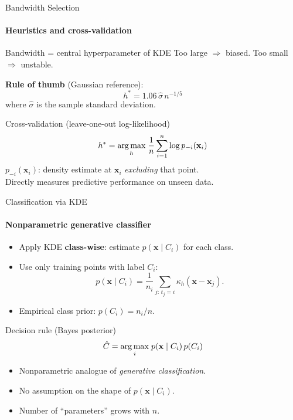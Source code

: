 \begin{frame}{Bandwidth Selection}
  \framesubtitle{Heuristics and cross-validation}
  \begin{block}{Bandwidth = central hyperparameter of KDE}
    Too large $\Rightarrow$ biased. \quad Too small $\Rightarrow$ unstable.
  \end{block}
  \medskip
  \textbf{Rule of thumb} (Gaussian reference):
  \[
    h^* = 1.06\,\hat{\sigma}\,n^{-1/5}
  \]
  where $\hat{\sigma}$ is the sample standard deviation.
  \medskip
  \begin{block}{Cross-validation (leave-one-out log-likelihood)}
    \[
      h^* = \underset{h}{\operatorname{arg\,max}}\;\frac{1}{n}\sum_{i=1}^{n}\log p_{-i}(\mathbf{x}_i)
    \]
    $p_{-i}(\mathbf{x}_i)$: density estimate at $\mathbf{x}_i$ \emph{excluding} that point.\\
    Directly measures predictive performance on unseen data.
  \end{block}
\end{frame}

\begin{frame}{Classification via KDE}
  \framesubtitle{Nonparametric generative classifier}
  \begin{itemize}
    \item Apply KDE \textbf{class-wise}: estimate $p(\mathbf{x}\mid C_i)$ for each class.
    \item Use only training points with label $C_i$:
    \[
      p(\mathbf{x}\mid C_i) = \frac{1}{n_i}\sum_{j:\,t_j=i}\kappa_h(\mathbf{x}-\mathbf{x}_j).
    \]
    \item Empirical class prior: $p(C_i) = n_i/n$.
  \end{itemize}
  \begin{block}{Decision rule (Bayes posterior)}
    \[
      \hat{C} = \underset{i}{\operatorname{arg\,max}}\; p(\mathbf{x}\mid C_i)\,p(C_i)
    \]
  \end{block}
  \begin{itemize}
    \item Nonparametric analogue of \emph{generative classification}.
    \item No assumption on the shape of $p(\mathbf{x}\mid C_i)$.
    \item Number of ``parameters'' grows with $n$.
  \end{itemize}
\end{frame}

